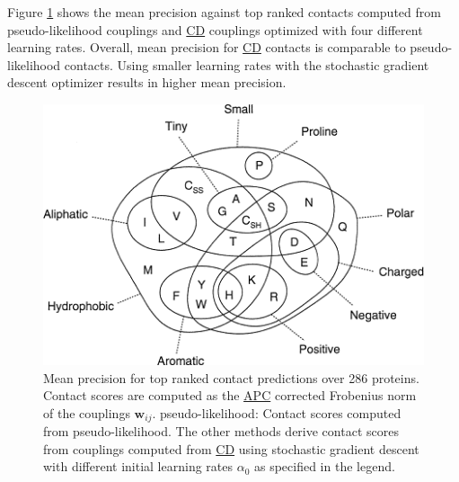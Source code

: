 \documentclass[12pt,a4paper,twoside]{book}
\newcommand{\wij}{\mathbf{w}_{ij}}
\theoremstyle{definition}
\theoremstyle{definition}
\theoremstyle{remark}
\begin{document}
Figure \ref{fig:performance-cd-alphaopt} shows the mean precision
against top ranked contacts computed from pseudo-likelihood couplings
and \protect\hyperlink{abbrev}{CD} couplings optimized with four
different learning rates. Overall, mean precision for
\protect\hyperlink{abbrev}{CD} contacts is comparable to
{pseudo-likelihood} contacts. Using smaller learning rates with the
stochastic gradient descent optimizer results in higher mean precision.










\begin{figure}

{\centering \includegraphics[width=0.9\linewidth]{img/aa_venn_diagram} 

}

\caption{Mean precision for top ranked
contact predictions over 286 proteins. Contact scores are computed as
the \protect\hyperlink{abbrev}{APC} corrected Frobenius norm of the
couplings \(\wij\). {pseudo-likelihood}: Contact scores computed from
pseudo-likelihood. The other methods derive contact scores from
couplings computed from \protect\hyperlink{abbrev}{CD} using stochastic
gradient descent with different initial learning rates \(\alpha_0\) as
specified in the legend.}\label{fig:performance-cd-alphaopt}
\end{figure}
\end{document}
